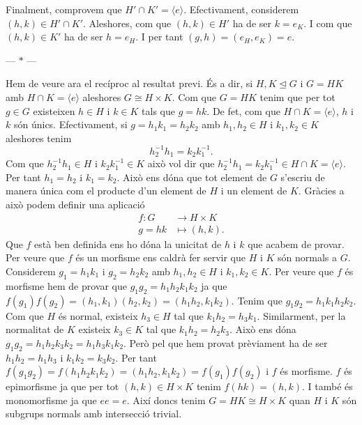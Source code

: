 \documentclass[12pt]{article}
\newcommand{\gen}[1]{\langle #1 \rangle}
\newcommand{\normal}{\trianglelefteq}
\newcommand{\parbreak}{
	\begin{center}
		--- $\ast$ ---
	\end{center} 
}
\begin{document}
Finalment, comprovem que \( H' \cap K' = \gen{e} \). Efectivament, considerem \( (h,k) \in H' \cap K' \). Aleshores, com que \( (h,k) \in H' \) ha de ser \( k = e_K \). I com que \( (h,k) \in K' \) ha de ser \( h = e_H \). I per tant \( (g,h) = (e_H, e_K) = e \).

\parbreak

Hem de veure ara el recíproc al resultat previ. És a dir, si \( H,K \normal G \) i \( G = HK \) amb \( H \cap K = \gen{e} \) aleshores \( G \cong H \times K \). Com que \( G = HK \) tenim que per tot \( g \in G \) existeixen \( h\in H \) i \( k \in K \) tals que \( g= hk \). De fet, com que \( H \cap K = \gen{e} \), \( h \) i \( k \) són únics. Efectivament, si \( g = h_1k_1 = h_2k_2 \) amb \( h_1,h_2 \in H \) i \( k_1,k_2 \in K \) aleshores tenim  
\begin{equation*}
	h_2^{-1}h_1 = k_2k_1^{-1}.
\end{equation*}
Com que \( h_2^{-1}h_1 \in H \) i \( k_2k_1^{-1} \in K \) això vol dir que \( h_2^{-1}h_1 = k_2k_1^{-1} \in H \cap K = \gen{e} \). Per tant \( h_1 = h_2 \) i \( k_1 = k_2 \). Això ens dóna que tot element de \( G \) s'escriu de manera única com el producte d'un element de \( H \) i un element de \( K \). Gràcies a això podem definir una aplicació 
\begin{align*}
	f \colon G & \longrightarrow H \times K \\
	g = hk & \longmapsto (h,k).
\end{align*}
Que \( f \) està ben definida ens ho dóna la unicitat de \( h \) i \( k \) que acabem de provar. Per veure que \( f \) és un morfisme ens caldrà fer servir que \( H \) i \( K \) són normals a \( G \). Considerem \( g_1 = h_1k_1 \) i \( g_2 = h_2k_2 \) amb \( h_1,h_2 \in H \) i \( k_1,k_2 \in K \). Per veure que \( f \) és morfisme hem de provar que \( g_1g_2 = h_1h_2k_1k_2 \) ja que \( f(g_1)f(g_2) = (h_1,k_1)(h_2,k_2) = (h_1h_2,k_1k_2) \). Tenim que \( g_1g_2 = h_1k_1h_2k_2 \). Com que \( H \) és normal, existeix \( h_3 \in H \) tal que \( k_1h_2 = h_3k_1 \). Similarment, per la normalitat de \( K \) existeix \( k_3 \in K \) tal que \( k_1h_2 = h_2k_3 \). Això ens dóna \( g_1g_2 = h_1h_2k_3k_2 = h_1h_3k_1k_2 \). Però pel que hem provat prèviament ha de ser \( h_1h_2 = h_1h_3 \) i \( k_1k_2 = k_3k_2 \). Per tant \( f(g_1g_2) = f(h_1h_2k_1k_2) = (h_1h_2,k_1k_2) = f(g_1)f(g_2) \) i \( f \) és morfisme. \( f \) és epimorfisme ja que per tot \( (h,k) \in H \times K \) tenim \( f(hk) = (h,k) \). I també és monomorfisme ja que \( ee = e \). Així doncs tenim \( G = HK \cong H \times K \) quan \( H \) i \( K \) són subgrups normals amb intersecció trivial.
\end{document}
